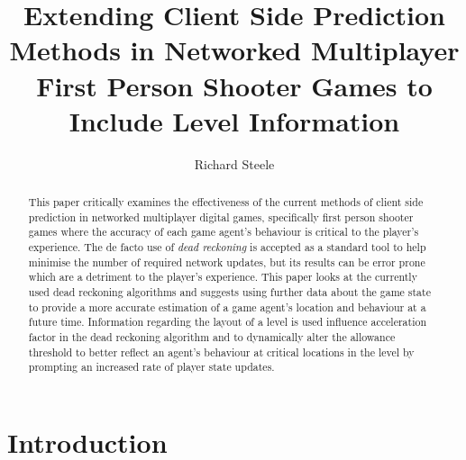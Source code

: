 \documentclass[journal]{IEEEtran}
\begin{document}
%
\title{Extending Client Side Prediction Methods in Networked Multiplayer First Person Shooter Games to Include Level Information}
%
%
\author{Richard Steele}


\maketitle

\begin{abstract}
This paper critically examines the effectiveness of the current methods of client side prediction in networked multiplayer digital games, specifically first person shooter games where the accuracy of each game agent's behaviour is critical to the player's experience. The de facto use of \textit{dead reckoning} is accepted as a standard tool to help minimise the number of required network updates, but its results can be error prone which are a detriment to the player's experience. This paper looks at the currently used dead reckoning algorithms and suggests using further data about the game state to provide a more accurate estimation of a game agent's location and behaviour at a future time. Information regarding the layout of a level is used influence acceleration factor in the dead reckoning algorithm and to dynamically alter the allowance threshold to better reflect an agent's behaviour at critical locations in the level by prompting an increased rate of player state updates.
\end{abstract}

\section{Introduction}
% 
% 
% 
\end{document}
